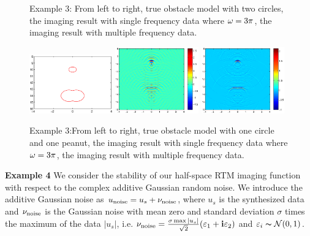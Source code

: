 \documentclass[12pt]{iopart}
\begin{document}
{\begin{figure}
	\caption{Example 3: From left to right,  true obstacle model with two circles, the imaging result
		with single frequency data where $\omega=3\pi$, the imaging result with multiple frequency data.}\label{figure_31}
\end{figure}

\begin{figure}
	\centering
	\includegraphics[width=0.32\textwidth,height=0.16\textheight]{./graphic/circle_0_4_peanut_1_profile.eps}
	\includegraphics[width=0.32\textwidth]{./graphic/circle_0_4_peanut_1_3pi_1.eps}
	\includegraphics[width=0.32\textwidth]{./graphic/circle_0_4_peanut_1_multi_1.eps}
	
	\caption{Example 3:From left to right,  true obstacle model with one circle and one peanut, the imaging result
		with single frequency data where $\omega=3\pi$, the imaging result with multiple frequency data.}\label{figure_32}
\end{figure}

\bigskip
\textbf{Example 4}
We consider the stability of our half-space RTM imaging
function with respect to the complex additive Gaussian random noise. We introduce
the additive Gaussian noise as $u_{\rm noise}=u_s+\nu_{\rm noise}$,
where $u_s$ is the synthesized data and $\nu_{\rm noise}$ is the Gaussian noise with mean zero and standard deviation $\sigma$ times the maximum of  the data $|u_s|$, i.e. $\nu_{\rm noise}=\frac{\sigma \max |u_s|}{\sqrt{2}}(\varepsilon_1+\mathbf{i}\varepsilon_2)$ and  $\varepsilon_i\thicksim \mathcal{N}(0,1)$.

}
\end{document}
